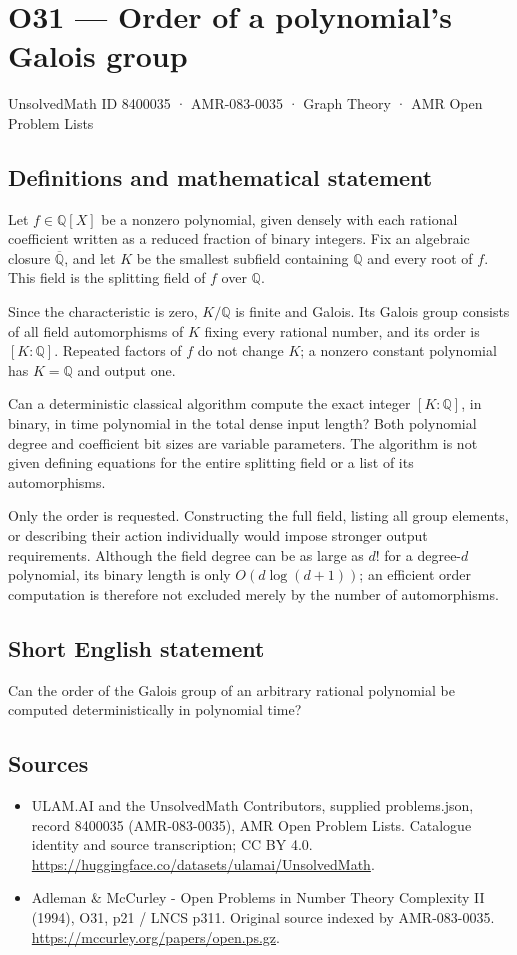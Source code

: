 \documentclass[11pt,a4paper]{article}
\begin{document}
\section*{O31 — Order of a polynomial's Galois group}\label{8400035}
{\small UnsolvedMath ID 8400035 · AMR-083-0035 · Graph Theory · AMR Open Problem Lists}
\subsection{Definitions and mathematical statement}
Let $f\in\mathbb Q[X]$ be a nonzero polynomial, given densely with each rational coefficient written as a reduced fraction of binary integers. Fix an algebraic closure $\overline{\mathbb Q}$, and let $K$ be the smallest subfield containing $\mathbb Q$ and every root of $f$. This field is the splitting field of $f$ over $\mathbb Q$.

Since the characteristic is zero, $K/\mathbb Q$ is finite and Galois. Its Galois group consists of all field automorphisms of $K$ fixing every rational number, and its order is $[K:\mathbb Q]$. Repeated factors of $f$ do not change $K$; a nonzero constant polynomial has $K=\mathbb Q$ and output one.

Can a deterministic classical algorithm compute the exact integer $[K:\mathbb Q]$, in binary, in time polynomial in the total dense input length? Both polynomial degree and coefficient bit sizes are variable parameters. The algorithm is not given defining equations for the entire splitting field or a list of its automorphisms.

Only the order is requested. Constructing the full field, listing all group elements, or describing their action individually would impose stronger output requirements. Although the field degree can be as large as $d!$ for a degree-$d$ polynomial, its binary length is only $O(d\log(d+1))$; an efficient order computation is therefore not excluded merely by the number of automorphisms.
\subsection{Short English statement}
Can the order of the Galois group of an arbitrary rational polynomial be computed deterministically in polynomial time?
\subsection{Sources}
\begin{itemize}
\item[S1] ULAM.AI and the UnsolvedMath Contributors, supplied problems.json, record 8400035 (AMR-083-0035), AMR Open Problem Lists. Catalogue identity and source transcription; CC BY 4.0.
\url{https://huggingface.co/datasets/ulamai/UnsolvedMath}.
\item[S2] Adleman \& McCurley - Open Problems in Number Theory Complexity II (1994), O31, p21 / LNCS p311. Original source indexed by AMR-083-0035.
\url{https://mccurley.org/papers/open.ps.gz}.
\end{itemize}
\end{document}

